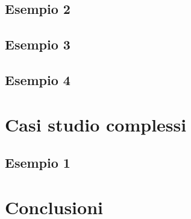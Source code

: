\documentclass{article}
\begin{document}
\subsection{Esempio 2}
\label{sec:esempio2}

\subsection{Esempio 3}
\label{sec:esempio3}

\subsection{Esempio 4}
\label{sec:esempio4}


\section{Casi studio complessi}

\subsection{Esempio 1}
\label{sec:complesso1}


\section{Conclusioni}
\end{document}
